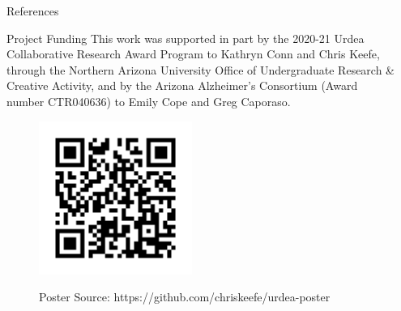 \documentclass[final]{beamer}
\newlength{\sepwidth}
\newlength{\colwidth}
\newcommand{\separatorcolumn}{\begin{column}{\sepwidth}\end{column}}
\begin{document}
\begin{frame}[t]
\begin{columns}[t]
\begin{column}{\colwidth}
\begin{block}{References}
  \end{block}

  \begin{block}{Project Funding}
    This work was supported in part by the 2020-21 Urdea Collaborative
    Research Award Program to Kathryn Conn and Chris Keefe, through the
    Northern Arizona University Office of Undergraduate Research \& Creative
    Activity, and by the Arizona Alzheimer’s Consortium (Award number
    CTR040636) to Emily Cope and Greg Caporaso.
  \end{block}

  \begin{figure}
    \begin{minipage}[c]{\textwidth}
      \hfill
      \includegraphics[height=5cm]{assets/repo}
    \end{minipage}
    \begin{minipage}[c]{\textwidth}
      \hfill
      Poster Source: https://github.com/chriskeefe/urdea-poster
    \end{minipage}
\end{figure}


\end{column}

\separatorcolumn
\end{columns}
\end{frame}
\end{document}

